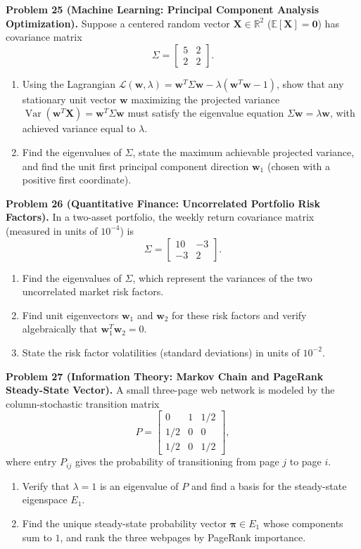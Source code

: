 \documentclass[11pt, letterpaper]{article}
\theoremstyle{definition}
\theoremstyle{remark}
\begin{document}
\textbf{Problem 25 (Machine Learning: Principal Component Analysis Optimization).}
Suppose a centered random vector $\mathbf{X} \in \mathbb{R}^2$ ($\mathbb{E}[\mathbf{X}] = \mathbf{0}$) has covariance matrix
\[
\Sigma = \begin{bmatrix} 5 & 2 \\ 2 & 2 \end{bmatrix}.
\]
\begin{enumerate}[label=(\alph*)]
    \item Using the Lagrangian $\mathcal{L}(\mathbf{w}, \lambda) = \mathbf{w}^T \Sigma \mathbf{w} - \lambda(\mathbf{w}^T \mathbf{w} - 1)$, show that any stationary unit vector $\mathbf{w}$ maximizing the projected variance $\operatorname{Var}(\mathbf{w}^T \mathbf{X}) = \mathbf{w}^T \Sigma \mathbf{w}$ must satisfy the eigenvalue equation $\Sigma\mathbf{w} = \lambda\mathbf{w}$, with achieved variance equal to $\lambda$.
    \item Find the eigenvalues of $\Sigma$, state the maximum achievable projected variance, and find the unit first principal component direction $\mathbf{w}_1$ (chosen with a positive first coordinate).
\end{enumerate}

\textbf{Problem 26 (Quantitative Finance: Uncorrelated Portfolio Risk Factors).}
In a two-asset portfolio, the weekly return covariance matrix (measured in units of $10^{-4}$) is
\[
\Sigma = \begin{bmatrix} 10 & -3 \\ -3 & 2 \end{bmatrix}.
\]
\begin{enumerate}[label=(\alph*)]
    \item Find the eigenvalues of $\Sigma$, which represent the variances of the two uncorrelated market risk factors.
    \item Find unit eigenvectors $\mathbf{w}_1$ and $\mathbf{w}_2$ for these risk factors and verify algebraically that $\mathbf{w}_1^T \mathbf{w}_2 = 0$.
    \item State the risk factor volatilities (standard deviations) in units of $10^{-2}$.
\end{enumerate}

\textbf{Problem 27 (Information Theory: Markov Chain and PageRank Steady-State Vector).}
A small three-page web network is modeled by the column-stochastic transition matrix
\[
P = \begin{bmatrix} 0 & 1 & 1/2 \\ 1/2 & 0 & 0 \\ 1/2 & 0 & 1/2 \end{bmatrix},
\]
where entry $P_{ij}$ gives the probability of transitioning from page $j$ to page $i$.
\begin{enumerate}[label=(\alph*)]
    \item Verify that $\lambda = 1$ is an eigenvalue of $P$ and find a basis for the steady-state eigenspace $E_1$.
    \item Find the unique steady-state probability vector $\boldsymbol{\pi} \in E_1$ whose components sum to $1$, and rank the three webpages by PageRank importance.
\end{enumerate}
\end{document}
